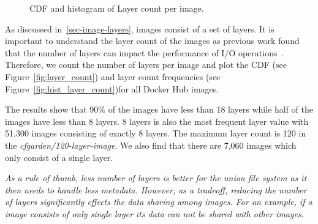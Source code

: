 \begin{figure}[!t]
	\centering
	\caption{CDF and histogram of Layer count per image.}
	\label{fig:image-size}
\end{figure}

As discussed in~\ref{sec-image-layers}, images consist of a set of layers.
It is important to understand the layer count of the images as previous
work found that the number of layers can impact the performance of
I/O operations~\cite{slacker}. Therefore, we count the number of layers
per image and plot the CDF (see Figure~\ref{fig:layer_count})
and layer count frequencies (see Figure~\ref{fig:hist_layer_count})for all
Docker Hub images.

The results show that 90\% of the images have less than 18 layers while
half of the images have less than 8 layers. 8 layers is also the most
frequent layer value with 51,300 images consisting of exactly 8 layers.
The maximum layer count is 120 in the \textit{cfgarden/120-layer-image}.
We also find that there are 7,060 images which only consist of a single layer.

\emph{As a rule of thumb, less number of layers is better for the union file
system as it then needs to handle less metadata. However, as a tradeoff,
reducing the number of layers significantly effects the data sharing among images.
For an example, if a image consists of only single layer its data can not be shared
with other images.}
%

